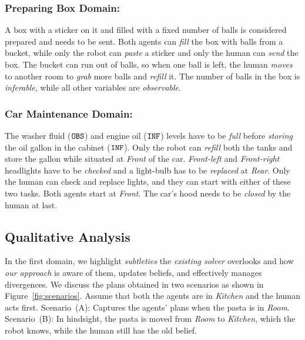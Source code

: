 \documentclass[letterpaper]{article} %
\begin{document}
\subsubsection{Preparing Box Domain:}
A box with a sticker on it and filled with a fixed number of balls is considered prepared and needs to be sent. Both agents can \textit{fill} the box with balls from a bucket, while only the robot can \textit{paste} a sticker and only the human can \textit{send} the box. The bucket can run out of balls, so when one ball is left, the human \textit{moves} to another room to \textit{grab} more balls and \textit{refill} it. 
The number of balls in the box is \textit{inferable}, while all other variables are {\em observable}. 

\subsubsection{Car Maintenance Domain:}
The washer fluid ($\texttt{OBS}$) and engine oil ($\texttt{INF}$) levels have to be \textit{full} before \textit{storing} the oil gallon in the cabinet ($\texttt{INF}$). 
Only the robot can \textit{refill} both the tanks and store the gallon while situated at \textit{Front} of the car. 
\textit{Front-left} and \textit{Front-right} headlights have to be \textit{checked} and a light-bulb has to be \textit{replaced} at \textit{Rear}. 
Only the human can check and replace lights, and they can start with either of these two tasks.
Both agents start at \textit{Front}.
The car's hood needs to be \textit{closed} by the human at last.

\subsection{Qualitative Analysis}

In the first domain, we highlight \textit{subtleties} the \textit{existing solver} overlooks and how \textit{our approach} is aware of them, updates beliefs, and effectively manages divergences. 
We discuss the plans obtained in two scenarios 
as shown in Figure~\ref{fig:scenarios}. Assume that both the agents are in \textit{Kitchen} and the human acts first. Scenario~(A): Captures the agents' plans when the pasta is in \textit{Room}. 
Scenario~(B): 
In hindsight, the pasta is moved from \textit{Room} to {\em Kitchen}, which the robot knows, while the human still has the old belief.
\end{document}
